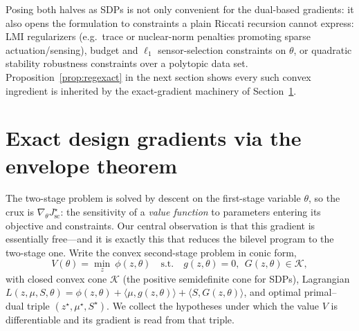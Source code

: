 \documentclass[twocolumn,amsthm]{autart}
\begin{document}
\begin{rem}
Posing both halves as SDPs is not only convenient for the dual-based gradients:
it also opens the formulation to constraints a plain Riccati recursion cannot
express: LMI regularizers (e.g.\ trace or nuclear-norm penalties promoting sparse
actuation/sensing), budget and $\ell_1$ sensor-selection constraints on $\theta$,
or quadratic stability robustness constraints over a polytopic data set. Proposition~\ref{prop:regexact} in the next section
shows every such convex ingredient is inherited by the exact-gradient machinery of
Section~\ref{sec:envelope}.
\end{rem}

\section{Exact design gradients via the envelope theorem}\label{sec:envelope}

The two-stage problem is solved by descent on the first-stage variable $\theta$,
so the crux is $\nabla_\theta J_{\mathrm{sc}}^\star$: the sensitivity of a
\emph{value function} to parameters entering its objective and constraints. Our
central observation is that this gradient is essentially free---and it is exactly
this that reduces the bilevel program to the two-stage one. Write the convex
second-stage problem in conic form,
\begin{equation}\label{eq:generic}
V(\theta) = \min_{z}\ \phi(z,\theta)\quad \text{s.t.}\quad g(z,\theta)=0,\ \
G(z,\theta) \in \mathcal{K},
\end{equation}
with closed convex cone $\mathcal{K}$ (the positive semidefinite cone for SDPs),
Lagrangian $L(z,\mu,S,\theta) = \phi(z,\theta) + \langle \mu, g(z,\theta)\rangle
+ \langle S, G(z,\theta)\rangle$, and optimal primal--dual triple
$(z^\star,\mu^\star,S^\star)$. We collect the hypotheses under which the value
$V$ is differentiable and its gradient is read from that triple.
\end{document}
